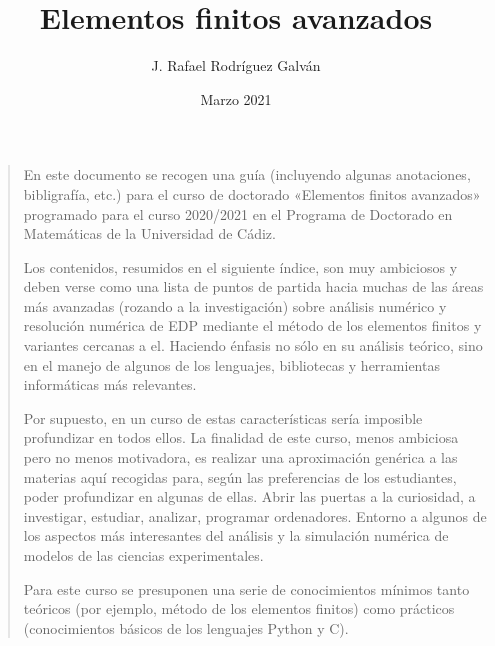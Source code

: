 \documentclass[11pt]{article}
\title{Elementos finitos avanzados}
\author{J. Rafael Rodríguez Galván}
\date{Marzo 2021}
\begin{document}
\maketitle
\tableofcontents

\begin{quote}
En este documento se recogen una guía (incluyendo algunas anotaciones,
bibligrafía, etc.) para el curso de doctorado «Elementos finitos
avanzados» programado para el curso 2020/2021 en el Programa de
Doctorado en Matemáticas de la Universidad de Cádiz.

Los contenidos, resumidos en el siguiente índice, son muy ambiciosos y
deben verse como una lista de puntos de partida hacia muchas de las
áreas más avanzadas (rozando a la investigación) sobre análisis
numérico y resolución numérica de EDP mediante el método de los
elementos finitos y variantes cercanas a el. Haciendo énfasis no sólo
en su análisis teórico, sino en el manejo de algunos de los lenguajes,
bibliotecas y herramientas informáticas más relevantes.

Por supuesto, en un curso de estas características sería imposible
profundizar en todos ellos. La finalidad de este curso, menos
ambiciosa pero no menos motivadora, es realizar una aproximación
genérica a las materias aquí recogidas para, según las preferencias de
los estudiantes, poder profundizar en algunas de ellas.  Abrir las
puertas a la curiosidad, a investigar, estudiar, analizar, programar
ordenadores. Entorno a algunos de los aspectos más interesantes del
análisis y la simulación numérica de modelos de las ciencias experimentales.

Para este curso se presuponen una serie de conocimientos mínimos tanto
teóricos (por ejemplo, método de los elementos finitos) como prácticos
(conocimientos básicos de los lenguajes Python y C).

\end{quote}















\end{document}
